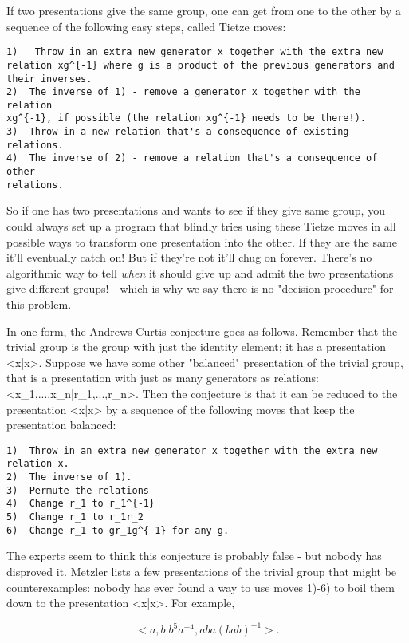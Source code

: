 If two presentations give the same group, one can get from one to the
other by a sequence of the following easy steps, called Tietze moves:

\begin{verbatim}
1)   Throw in an extra new generator x together with the extra new
relation xg^{-1} where g is a product of the previous generators and
their inverses.
2)  The inverse of 1) - remove a generator x together with the relation
xg^{-1}, if possible (the relation xg^{-1} needs to be there!).
3)  Throw in a new relation that's a consequence of existing relations.
4)  The inverse of 2) - remove a relation that's a consequence of other
relations.  
\end{verbatim}
    

So if one has two presentations and wants to see if they give same
group, you could always set up a program that blindly tries using these
Tietze moves in all possible ways to transform one presentation into the
other.  If they are the same it'll eventually catch on!  But if they're
not it'll chug on forever.  There's no algorithmic way to tell \emph{when} it
should give up and admit the two presentations give different groups! -
which is why we say there is no "decision procedure" for this problem.  

In one form, the Andrews-Curtis conjecture goes as follows.  Remember
that the trivial group is the group with just the identity element; it
has a presentation <x|x>.  Suppose we have some other "balanced" presentation
of the trivial group, that is a presentation with just as many
generators as relations: <x_1,...,x_n|r_1,...,r_n>.  Then the conjecture
is that it can be reduced to the presentation <x|x> by a sequence of the
following moves that keep the presentation balanced:

\begin{verbatim}
1)  Throw in an extra new generator x together with the extra new
relation x.
2)  The inverse of 1).
3)  Permute the relations
4)  Change r_1 to r_1^{-1}
5)  Change r_1 to r_1r_2
6)  Change r_1 to gr_1g^{-1} for any g.
\end{verbatim}
    

The experts seem to think this conjecture is probably false - but
nobody has disproved it.   Metzler lists a few presentations of the
trivial group that might be counterexamples: nobody has ever found a way
to use moves 1)-6) to boil them down to the presentation <x|x>.  For example,

$$
<a, b|b^5a^{-4}, aba(bab)^{-1}>.
$$
    


